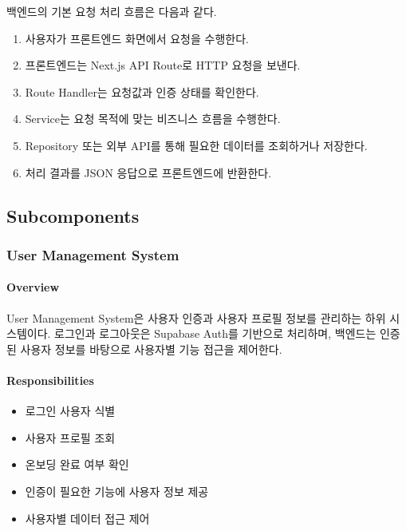 \documentclass[11pt,a4paper]{article}
\providecommand{\tightlist}{%
  \setlength{\itemsep}{0.25em}\setlength{\parskip}{0.1em}}
\begin{document}
백엔드의 기본 요청 처리 흐름은 다음과 같다.

\begin{enumerate}
\def\labelenumi{\arabic{enumi}.}
\tightlist
\item
  사용자가 프론트엔드 화면에서 요청을 수행한다.
\item
  프론트엔드는 Next.js API Route로 HTTP 요청을 보낸다.
\item
  Route Handler는 요청값과 인증 상태를 확인한다.
\item
  Service는 요청 목적에 맞는 비즈니스 흐름을 수행한다.
\item
  Repository 또는 외부 API를 통해 필요한 데이터를 조회하거나 저장한다.
\item
  처리 결과를 JSON 응답으로 프론트엔드에 반환한다.
\end{enumerate}

\clearpage

\hypertarget{subcomponents}{%
\subsection{Subcomponents}\label{subcomponents}}

\hypertarget{user-management-system}{%
\subsubsection{User Management System}\label{user-management-system}}

\hypertarget{overview}{%
\paragraph{Overview}\label{overview}}

User Management System은 사용자 인증과 사용자 프로필 정보를 관리하는 하위 시스템이다. 로그인과 로그아웃은 Supabase Auth를 기반으로 처리하며, 백엔드는 인증된 사용자 정보를 바탕으로 사용자별 기능 접근을 제어한다.

\hypertarget{responsibilities}{%
\paragraph{Responsibilities}\label{responsibilities}}

\begin{itemize}
\tightlist
\item
  로그인 사용자 식별
\item
  사용자 프로필 조회
\item
  온보딩 완료 여부 확인
\item
  인증이 필요한 기능에 사용자 정보 제공
\item
  사용자별 데이터 접근 제어
\end{itemize}
\end{document}
